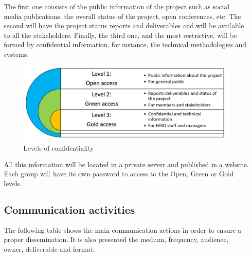 The first one consists of the public information of the project such as social media publications, the overall status of the project, open conferences, etc. The second will have the project status reports and deliverables and will be available to all the stakeholders. Finally, the third one, and the most restrictive, will be formed by confidential information, for instance, the technical methodologies and systems.

\begin{figure}[H]
	\centering
	\includegraphics[width=\textwidth]{images/knowledgement.png}
	\caption{Levels of confidentiality} 
	\label{knowledge}
\end{figure}

All this information will be located in a private server and published in a website. Each group will have its own password to access to the Open, Green or Gold levels.


\subsection{Communication activities}

The following table shows the main communication actions in order to ensure a proper dissemination. It is also presented the medium, frequency, audience, owner, deliverable and format.

